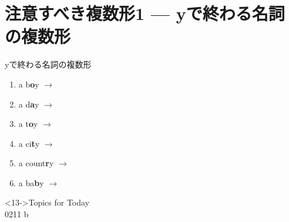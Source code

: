 \documentclass[aspectratio=169,xcolor={dvipsnames,table}]{beamer}
\newcommand{\myaudio}[1]{\href{#1}{\faVolumeUp}}
\begin{document}
\section{注意すべき複数形1 --- yで終わる名詞の複数形}
\begin{frame}[plain]{yで終わる名詞の複数形}\Large
  \begin{enumerate}
    \item<1-> a b\textbf<14->{\textcolor<14->{YellowOrange}{o}}y $\rightarrow$ 
    \item<3-> a d\textbf<14->{\textcolor<14->{YellowOrange}{a}}y $\rightarrow$ 
    \item<5-> a t\textbf<14->{\textcolor<14->{YellowOrange}{o}}y $\rightarrow$ 
    \item<7-> a ci\textbf<14->{\textcolor<14->{CarnationPink}{t}}y $\rightarrow$ 
    \item<9-> a count\textbf<14->{\textcolor<14->{CarnationPink}{r}}y $\rightarrow$ 
    \item<11-> a ba\textbf<14->{\textcolor<14->{CarnationPink}{b}}y $\rightarrow$ 
  \end{enumerate}

  \normalsize
  \begin{block}<13->{Topics for Today}
    \\
    {\tiny 0211}\,{\scriptsize \myaudio{./audio/005_singular_plural_b.mp3}}\,{\tiny b}\hfill{}
  \end{block}

\end{frame}
\end{document}

